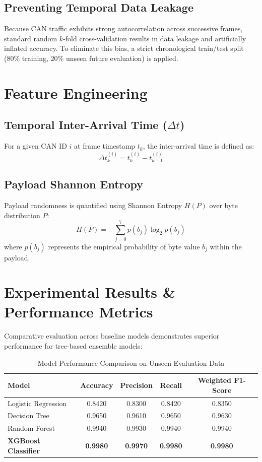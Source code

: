 \documentclass[12pt,a4paper]{report}
\begin{document}
\section{Preventing Temporal Data Leakage}
Because CAN traffic exhibits strong autocorrelation across successive frames, standard random $k$-fold cross-validation results in data leakage and artificially inflated accuracy. To eliminate this bias, a strict chronological train/test split (80\% training, 20\% unseen future evaluation) is applied.

\chapter{Feature Engineering}
\section{Temporal Inter-Arrival Time ($\Delta t$)}
For a given CAN ID $i$ at frame timestamp $t_k$, the inter-arrival time is defined as:
\begin{equation}
\Delta t_k^{(i)} = t_k^{(i)} - t_{k-1}^{(i)}
\end{equation}

\section{Payload Shannon Entropy}
Payload randomness is quantified using Shannon Entropy $H(P)$ over byte distribution $P$:
\begin{equation}
H(P) = -\sum_{j=0}^{7} p(b_j) \log_2 p(b_j)
\end{equation}
where $p(b_j)$ represents the empirical probability of byte value $b_j$ within the payload.

\chapter{Experimental Results \& Performance Metrics}
Comparative evaluation across baseline models demonstrates superior performance for tree-based ensemble models:

\begin{table}[h]
\centering
\caption{Model Performance Comparison on Unseen Evaluation Data}
\begin{tabular}{lcccc}
\toprule
\textbf{Model} & \textbf{Accuracy} & \textbf{Precision} & \textbf{Recall} & \textbf{Weighted F1-Score} \\
\midrule
Logistic Regression & 0.8420 & 0.8300 & 0.8420 & 0.8350 \\
Decision Tree & 0.9650 & 0.9610 & 0.9650 & 0.9630 \\
Random Forest & 0.9940 & 0.9930 & 0.9940 & 0.9940 \\
\textbf{XGBoost Classifier} & \textbf{0.9980} & \textbf{0.9970} & \textbf{0.9980} & \textbf{0.9980} \\
\bottomrule
\end{tabular}
\end{table}
\end{document}

